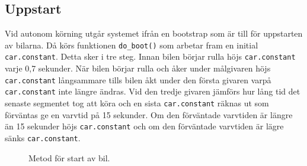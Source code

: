 \subsection{Uppstart} 
\label{sec:systembeskrivning:uppstart}
Vid autonom körning utgår systemet ifrån en bootstrap som är till för uppstarten av bilarna. Då körs funktionen \texttt{do\_boot()} som arbetar fram en
initial \texttt{car.constant}. Detta sker i tre steg. Innan bilen börjar rulla
höjs \texttt{car.constant} varje 0,7 sekunder. När bilen börjar rulla och åker
under målgivaren höjs \texttt{car.constant} långsammare tills bilen åkt under
den första givaren varpå \texttt{car.constant} inte längre ändras. Vid den
tredje givaren jämförs hur lång tid det senaste segmentet tog att köra och en
sista \texttt{car.constant} räknas ut som förväntas ge en varvtid på 15
sekunder. Om den förväntade varvtiden är längre än 15 sekunder höjs
\texttt{car.constant} och om den förväntade varvtiden är lägre sänks
\texttt{car.constant}.

\begin{figure}
	\centering
	\caption{Metod för start av bil.}
	\label{fig:bootstrap}
\end{figure}
